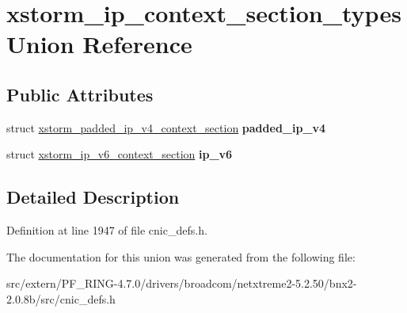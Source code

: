 \hypertarget{unionxstorm__ip__context__section__types}{
\section{xstorm\_\-ip\_\-context\_\-section\_\-types Union Reference}
\label{unionxstorm__ip__context__section__types}
}
\subsection*{Public Attributes}
\begin{DoxyCompactItemize}
\item 
\hypertarget{unionxstorm__ip__context__section__types_a07a219f90712735424d81fdfab0800ca}{
struct \hyperlink{structxstorm__padded__ip__v4__context__section}{xstorm\_\-padded\_\-ip\_\-v4\_\-context\_\-section} {\bfseries padded\_\-ip\_\-v4}}
\label{unionxstorm__ip__context__section__types_a07a219f90712735424d81fdfab0800ca}

\item 
\hypertarget{unionxstorm__ip__context__section__types_a5e83f5f071b91baf3c1735fe3c3138b9}{
struct \hyperlink{structxstorm__ip__v6__context__section}{xstorm\_\-ip\_\-v6\_\-context\_\-section} {\bfseries ip\_\-v6}}
\label{unionxstorm__ip__context__section__types_a5e83f5f071b91baf3c1735fe3c3138b9}

\end{DoxyCompactItemize}


\subsection{Detailed Description}


Definition at line 1947 of file cnic\_\-defs.h.



The documentation for this union was generated from the following file:\begin{DoxyCompactItemize}
\item 
src/extern/PF\_\-RING-\/4.7.0/drivers/broadcom/netxtreme2-\/5.2.50/bnx2-\/2.0.8b/src/cnic\_\-defs.h\end{DoxyCompactItemize}
